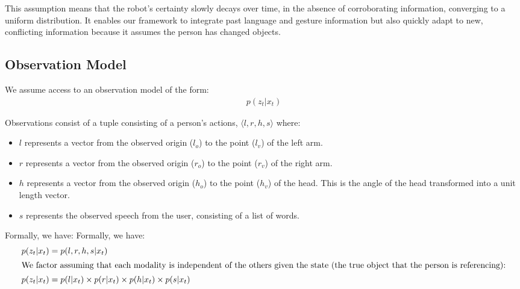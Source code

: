 \documentclass[a4paper, 11pt]{article} %
\begin{document}
This assumption means that the robot's certainty slowly decays over
time, in the absence of corroborating information, converging to a
uniform distribution.  It enables our framework to integrate past
language and gesture information but also quickly adapt to new,
conflicting information because it assumes the person has changed
objects.
\subsection{Observation Model}
We assume access to an observation model of the form:
\begin{align}
p(z_t | x_t)
\end{align}

Observations consist of a tuple consisting of a person's actions,
$\langle l, r, h, s\rangle $ where:
\begin{itemize}
	\item $l$ represents a vector from the observed origin ($l_o$) to the point ($l_v$) of the left arm.
	\item $r$ represents a vector from the observed origin ($r_o$) to the point ($r_v$) of the right arm.
	\item $h$ represents a vector from the observed origin ($h_o$) to the point ($h_v$) of the head. This is the angle of the head transformed into a unit length vector.
	\item $s$ represents the observed speech from the user,
          consisting of a list of words.
	\end{itemize}

Formally, we have:
Formally, we have:
\begin{align}
p(z_t | x_t) &= p(l, r, h, s | x_t)\\
\intertext{We factor assuming that each modality is independent of the others given the state (the true object that the person is referencing):}
p(z_t | x_t) &= p(l | x_t) \times p(r | x_t) \times p(h | x_t) \times p(s | x_t)
\end{align}
\end{document}
